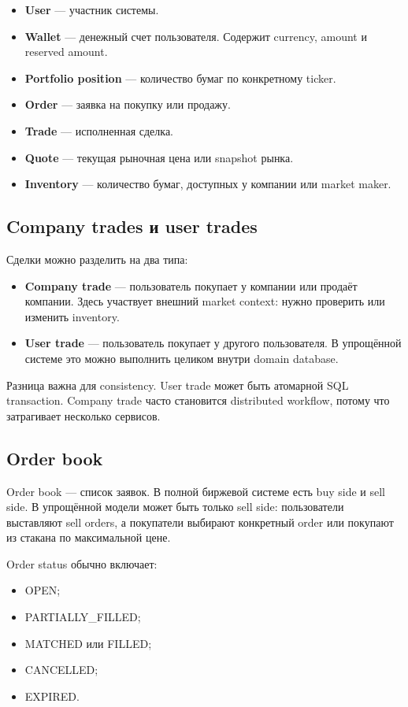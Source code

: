 \documentclass[12pt,a4paper]{article}
\begin{document}
\begin{itemize}
    \item \textbf{User} --- участник системы.
    \item \textbf{Wallet} --- денежный счет пользователя. Содержит currency,
          amount и reserved amount.
    \item \textbf{Portfolio position} --- количество бумаг по конкретному ticker.
    \item \textbf{Order} --- заявка на покупку или продажу.
    \item \textbf{Trade} --- исполненная сделка.
    \item \textbf{Quote} --- текущая рыночная цена или snapshot рынка.
    \item \textbf{Inventory} --- количество бумаг, доступных у компании или
          market maker.
\end{itemize}

\subsection{Company trades и user trades}

Сделки можно разделить на два типа:
\begin{itemize}
    \item \textbf{Company trade} --- пользователь покупает у компании или продаёт
          компании. Здесь участвует внешний market context: нужно проверить или
          изменить inventory.
    \item \textbf{User trade} --- пользователь покупает у другого пользователя.
          В упрощённой системе это можно выполнить целиком внутри domain database.
\end{itemize}

Разница важна для consistency. User trade может быть атомарной SQL transaction.
Company trade часто становится distributed workflow, потому что затрагивает
несколько сервисов.

\subsection{Order book}

Order book --- список заявок. В полной биржевой системе есть buy side и sell side.
В упрощённой модели может быть только sell side: пользователи выставляют sell
orders, а покупатели выбирают конкретный order или покупают из стакана по
максимальной цене.

Order status обычно включает:
\begin{itemize}
    \item OPEN;
    \item PARTIALLY\_FILLED;
    \item MATCHED или FILLED;
    \item CANCELLED;
    \item EXPIRED.
\end{itemize}
\end{document}
